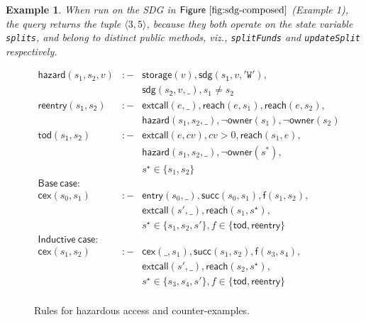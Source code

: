 \documentclass[conference, romanappendices]{tex/IEEEtran}
\theoremstyle{bfnote}
\newcommand{\viz}{\textit{viz.}}
\newcommand{\Fig}[1]{\ensuremath{\sf Figure~\ref{#1}}}
\newtheorem{example}{Example}
\begin{document}
\vspace{-2mm}
\noindent
\begin{example}
When run on the SDG in \Fig{fig:sdg-composed} (Example 1), the query returns the tuple $\langle 3, 5 \rangle$, because they both operate on the state variable \texttt{splits}, and belong to distinct public methods, \viz, \texttt{splitFunds} and \texttt{updateSplit} respectively.
\end{example}

\begin{figure}[t]
	\vspace{-2mm}
	\small
	\[\begin{array}{rlll}
	\mathsf{hazard}(s_1, s_2, v) & :- & \mathsf{storage}(v), \mathsf{sdg}(s_{\mathsf{1}}, v, \mathtt{'W'}),\\
	& &\mathsf{sdg}(s_{\mathsf{2}}, v, \_), s_1\neq s_2 \\
	
	\mathsf{reentry}(s_{\mathsf{1}}, s_{\mathsf{2}}) & :- & \mathsf{extcall}(e, \_), \mathsf{reach}(e, s_1), \mathsf{reach}(e, s_2),  \\
	& & \mathsf{hazard}(s_1, s_2, \_), \neg \mathsf{owner}(s_1), \neg \mathsf{owner}(s_2)\\
	
	\mathsf{tod}(s_{\mathsf{1}}, s_{\mathsf{2}}) & :- & \mathsf{extcall}(e, cv), cv > 0, \mathsf{reach}(s_1, e),\\ 
	& & \mathsf{hazard}(s_1, s_2, \_), \neg \mathsf{owner}(s^*),\\ 
	& & s^{\star}\in \{s_1, s_2\} \\
	
	\mathsf{Base \ case:} \\
	\mathsf{cex}(s_0, s_1) & :- & \mathsf{entry}(s_0, \_), \mathsf{succ}(s_0, s_1), \mathsf{f}(s_1,s_2), \\ 
	& &\mathsf{extcall}(s',\_), \mathsf{reach}(s_1, s^{\star}), \\
	& & s^{\star}\in \{s_1,s_2,s'\}, f \in \{\mathsf{tod,reentry}\}\\
	\mathsf{Inductive \ case:} \\
	\mathsf{cex}(s_1, s_2) & :- & \mathsf{cex}(\_, s_1), \mathsf{succ}(s_1, s_2), \mathsf{f}(s_3,s_4), \\ 
	& &\mathsf{extcall}(s',\_),\mathsf{reach}(s_2, s^{\star}),\\ 
	& & s^{\star} \in \{s_3,s_4,s'\}, f \in \{\mathsf{tod,reentry}\}\\
	\end{array}\]
	\vspace{-4mm}
	\caption{\small Rules for hazardous access and counter-examples.}
	\label{fig:ce-rule}
	\vspace{-6mm}
\end{figure}
\end{document}
